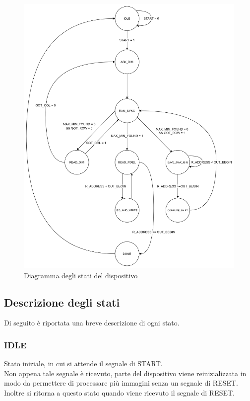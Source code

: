 \documentclass[a4paper, 12pt]{article}
\begin{document}
\bigskip
\begin{figure}[h]
    \centering
    \includegraphics[scale=0.150]{architettura/FSM diagram.png}
    \caption{Diagramma degli stati del dispositivo}
    \label{fig:fsm_diagram}
\end{figure}


\pagebreak
\subsection{Descrizione degli stati}
Di seguito è riportata una breve descrizione di ogni stato.

\subsubsection{IDLE}
Stato iniziale, in cui si attende il segnale di START. \\
Non appena tale segnale è ricevuto, parte del dispositivo viene reinizializzata in modo da permettere di processare più immagini senza un segnale di RESET. \\
Inoltre si ritorna a questo stato quando viene ricevuto il segnale di RESET.
\end{document}
